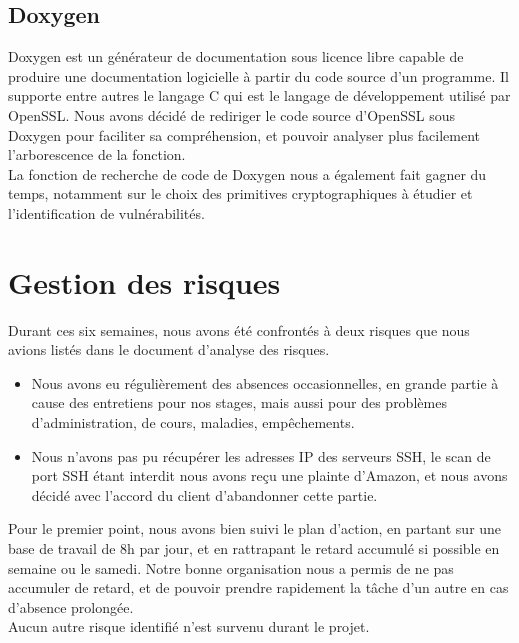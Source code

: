 \subsection{Doxygen}

Doxygen est un générateur de documentation sous licence libre capable de produire une documentation logicielle à partir du code source d'un programme. Il supporte entre autres le langage C qui est le langage de développement utilisé par OpenSSL. Nous avons décidé de rediriger le code source d'OpenSSL sous Doxygen pour faciliter sa compréhension, et pouvoir analyser plus facilement l'arborescence de la fonction.\\
La fonction de recherche de code de Doxygen nous a également fait gagner du temps, notamment sur le choix des primitives cryptographiques à étudier et l'identification de vulnérabilités.\\

\section{Gestion des risques}

Durant ces six semaines, nous avons été confrontés à deux risques que nous avions listés dans le document d'analyse des risques.
\begin{itemize}
\item Nous avons eu régulièrement des absences occasionnelles, en grande partie à cause des entretiens pour nos stages, mais aussi pour des problèmes d'administration, de cours, maladies, empêchements.
\item Nous n'avons pas pu récupérer les adresses IP des serveurs SSH, le scan de port SSH étant interdit nous avons reçu une plainte d'Amazon, et nous avons décidé avec l'accord du client d'abandonner cette partie.\\
\end{itemize}

Pour le premier point, nous avons bien suivi le plan d'action, en partant sur une base de travail de 8h par jour, et en rattrapant le retard accumulé si possible en semaine ou le samedi. Notre bonne organisation nous a permis de ne pas accumuler de retard, et de pouvoir prendre rapidement la tâche d'un autre en cas d'absence prolongée.\\

Aucun autre risque identifié n'est survenu durant le projet.
